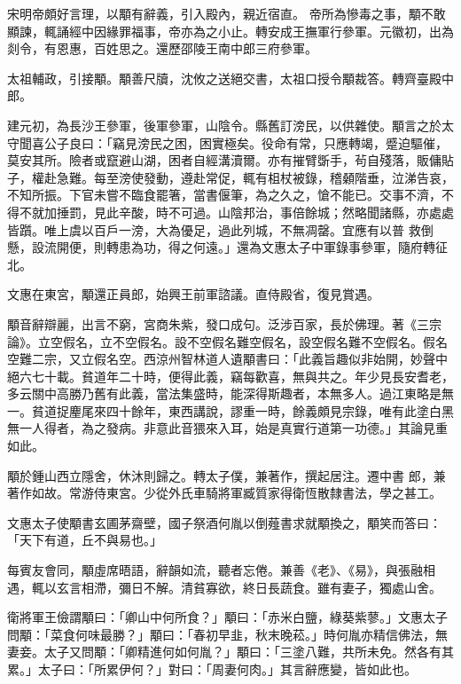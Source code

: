 \begin{pinyinscope}
 宋明帝頗好言理，以顒有辭義，引入殿內，親近宿直。
 帝所為慘毒之事，顒不敢顯諫，輒誦經中因緣罪福事，帝亦為之小止。轉安成王撫軍行參軍。元徽初，出為剡令，有恩惠，百姓思之。還歷邵陵王南中郎三府參軍。



 太祖輔政，引接顒。顒善尺牘，沈攸之送絕交書，太祖口授令顒裁答。轉齊臺殿中郎。



 建元初，為長沙王參軍，後軍參軍，山陰令。縣舊訂滂民，以供雜使。顒言之於太守聞喜公子良曰：「竊見滂民之困，困實極矣。役命有常，只應轉竭，蹙迫驅催，莫安其所。險者或竄避山湖，困者自經溝瀆爾。亦有摧臂斲手，茍自殘落，販傭貼子，權赴急難。每至滂使發動，遵赴常促，輒有柤杖被錄，稽顙階垂，泣涕告哀，不知所振。下官未嘗不臨食罷箸，當書偃筆，為之久之，愴不能已。交事不濟，不得不就加捶罰，見此辛酸，時不可過。山陰邦治，事倍餘城；然略聞諸縣，亦處處皆躓。唯上虞以百戶一滂，大為優足，過此列城，不無凋罄。宜應有以普
 救倒懸，設流開便，則轉患為功，得之何遠。」還為文惠太子中軍錄事參軍，隨府轉征北。



 文惠在東宮，顒還正員郎，始興王前軍諮議。直侍殿省，復見賞遇。



 顒音辭辯麗，出言不窮，宮商朱紫，發口成句。泛涉百家，長於佛理。著《三宗論》。立空假名，立不空假名。設不空假名難空假名，設空假名難不空假名。假名空難二宗，又立假名空。西涼州智林道人遺顒書曰：「此義旨趣似非始開，妙聲中絕六七十載。貧道年二十時，便得此義，竊每歡喜，無與共之。年少見長安耆老，多云關中高勝乃舊有此義，當法集盛時，能深得斯趣者，本無多人。過江東略是無一。貧道捉麈尾來四十餘年，東西講說，謬重一時，餘義頗見宗錄，唯有此塗白黑無一人得者，為之發病。非意此音猥來入耳，始是真實行道第一功德。」其論見重如此。



 顒於鍾山西立隱舍，休沐則歸之。轉太子僕，兼著作，撰起居注。遷中書
 郎，兼著作如故。常游侍東宮。少從外氏車騎將軍臧質家得衛恆散隸書法，學之甚工。



 文惠太子使顒書玄圃茅齋壁，國子祭酒何胤以倒薤書求就顒換之，顒笑而答曰：「天下有道，丘不與易也。」



 每賓友會同，顒虛席晤語，辭韻如流，聽者忘倦。兼善《老》、《易》，與張融相遇，輒以玄言相滯，彌日不解。清貧寡欲，終日長蔬食。雖有妻子，獨處山舍。



 衛將軍王儉謂顒曰：「卿山中何所食？」顒曰：「赤米白鹽，綠葵紫蓼。」文惠太子問顒：「菜食何味最勝？」顒曰：「春初早韭，秋末晚菘。」時何胤亦精信佛法，無妻妾。太子又問顒：「卿精進何如何胤？」顒曰：「三塗八難，共所未免。然各有其累。」太子曰：「所累伊何？」對曰：「周妻何肉。」其言辭應變，皆如此也。




\end{pinyinscope}
